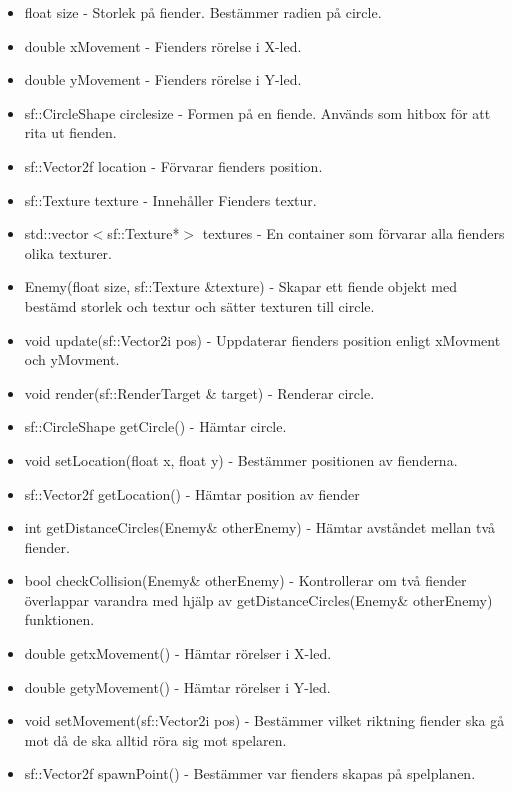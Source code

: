 \documentclass[12pt]{TDP005mall}
\begin{document}
\begin{itemize}
    \item float size - Storlek på fiender. Bestämmer radien på circle.
    
    \item double xMovement - Fienders rörelse i X-led.
    
    \item double yMovement - Fienders rörelse i Y-led.
    
    \item sf::CircleShape circle{size} - Formen på en fiende. Används som hitbox för att rita ut fienden.
    
    \item sf::Vector2f location{} - Förvarar fienders position.
    
    \item sf::Texture texture - Innehåller Fienders textur.
    
    \item std::vector\quad $<$sf::Texture*$>$ textures - En container som förvarar alla fienders olika texturer.

    \item Enemy(float size, sf::Texture \&texture) - Skapar ett fiende objekt med bestämd storlek och textur och sätter texturen till circle.
    
    \item void update(sf::Vector2i pos) - Uppdaterar fienders position enligt xMovment och yMovment. 
    
    \item void render(sf::RenderTarget \& target) - Renderar circle.
    
    \item sf::CircleShape getCircle() - Hämtar circle.
    
    \item void setLocation(float x, float y) - Bestämmer positionen av fienderna.
    
    \item sf::Vector2f getLocation() - Hämtar position av fiender
    
    \item int getDistanceCircles(Enemy\& otherEnemy) - Hämtar avståndet mellan två fiender.
    
    \item bool checkCollision(Enemy\& otherEnemy) - Kontrollerar om två fiender överlappar varandra med hjälp av getDistanceCircles(Enemy\& otherEnemy) funktionen.
    
    \item double getxMovement() - Hämtar rörelser i X-led.
    
    \item double getyMovement() - Hämtar rörelser i Y-led.
    
    \item void setMovement(sf::Vector2i pos) - Bestämmer vilket riktning fiender ska gå mot då de ska alltid röra sig mot spelaren.
    
    \item sf::Vector2f spawnPoint() - Bestämmer var fienders skapas på spelplanen.
\end{itemize}
\end{document}
